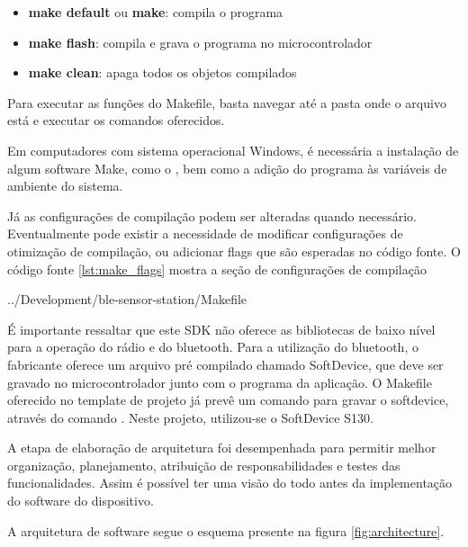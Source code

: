 \begin{itemize}
  \item \textbf{make default} ou \textbf{make}: compila o programa
  \item \textbf{make flash}: compila e grava o programa no microcontrolador
  \item \textbf{make clean}: apaga todos os objetos compilados
\end{itemize}

Para executar as funções do Makefile, basta navegar até a pasta onde o arquivo
está e executar os comandos oferecidos.

Em computadores com sistema operacional Windows, é necessária a instalação de
algum software Make, como o , bem como a adição
do programa às variáveis de ambiente do sistema.

Já as configurações de compilação podem ser alteradas quando necessário.
Eventualmente pode existir a necessidade de modificar configurações de
otimização de compilação, ou adicionar flags que são esperadas no código fonte.
O código fonte \ref{lst:make_flags} mostra a seção de configurações de
compilação

\begin{minipage}{0.95\linewidth}

{../Development/ble-sensor-station/Makefile}
\end{minipage}

É importante ressaltar que este SDK não oferece as bibliotecas de
baixo nível para a operação do rádio e do bluetooth. Para a utilização do bluetooth, o
fabricante oferece um arquivo pré compilado chamado SoftDevice, que deve ser
gravado no microcontrolador junto com o programa da aplicação. O Makefile
oferecido no template de projeto já prevê um comando para gravar o softdevice,
através do comando . Neste projeto,
utilizou-se o SoftDevice S130.



A etapa de elaboração de arquitetura foi desempenhada para permitir melhor
organização, planejamento, atribuição de responsabilidades e testes das
funcionalidades.
Assim é possível ter uma visão do todo antes da implementação do software do dispositivo.

A arquitetura de software segue o esquema presente na figura
\ref{fig:architecture}.

